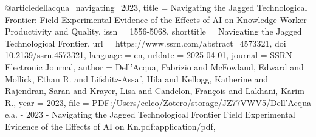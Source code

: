 @article{dellacqua_navigating_2023,
	title = {Navigating the {Jagged} {Technological} {Frontier}: {Field} {Experimental} {Evidence} of the {Effects} of {AI} on {Knowledge} {Worker} {Productivity} and {Quality}},
	issn = {1556-5068},
	shorttitle = {Navigating the {Jagged} {Technological} {Frontier}},
	url = {https://www.ssrn.com/abstract=4573321},
	doi = {10.2139/ssrn.4573321},
	language = {en},
	urldate = {2025-04-01},
	journal = {SSRN Electronic Journal},
	author = {Dell'Acqua, Fabrizio and McFowland, Edward and Mollick, Ethan R. and Lifshitz-Assaf, Hila and Kellogg, Katherine and Rajendran, Saran and Krayer, Lisa and Candelon, François and Lakhani, Karim R.},
	year = {2023},
	file = {PDF:/Users/eelco/Zotero/storage/JZ77VWV5/Dell'Acqua e.a. - 2023 - Navigating the Jagged Technological Frontier Field Experimental Evidence of the Effects of AI on Kn.pdf:application/pdf},
}